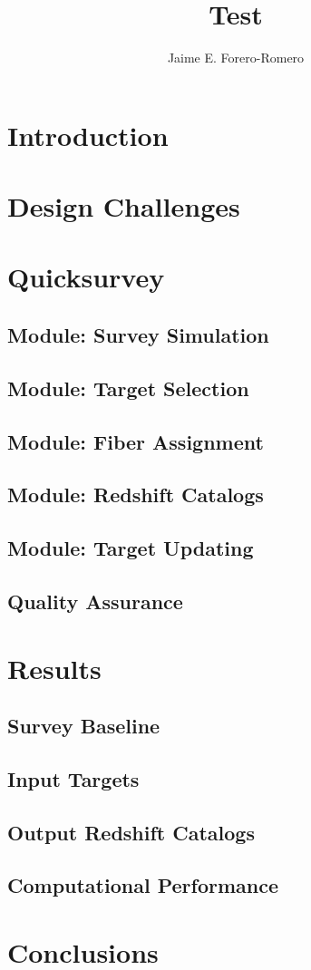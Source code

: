 \documentclass{article}
\begin{document}
\title{Test}
\author{Jaime E. Forero-Romero}
\maketitle

\section{Introduction}

\section{Design Challenges}

\section{Quicksurvey}

\subsection{Module: Survey Simulation}

\subsection{Module: Target Selection}

\subsection{Module: Fiber Assignment}

\subsection{Module: Redshift Catalogs}

\subsection{Module: Target Updating}

\subsection{Quality Assurance}

\section{Results}

\subsection{Survey Baseline}

\subsection{Input Targets}

\subsection{Output Redshift Catalogs}

\subsection{Computational Performance}

\section{Conclusions}
\end{document}
